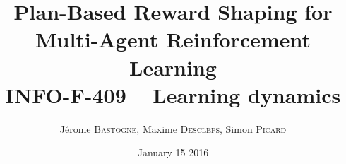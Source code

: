 \documentclass{bredelebeamer}
\begin{document}
\title[PBRS for MARL]{\textbf{Plan-Based Reward Shaping for Multi-Agent Reinforcement Learning} \\INFO-F-409 -- Learning dynamics} %

\author[]{Jérome \textsc{Bastogne}, Maxime \textsc{Desclefs}, Simon \textsc{Picard}}
\date{January 15 2016} %

\begin{frame}
\titlepage %
\end{frame}
\end{document}
